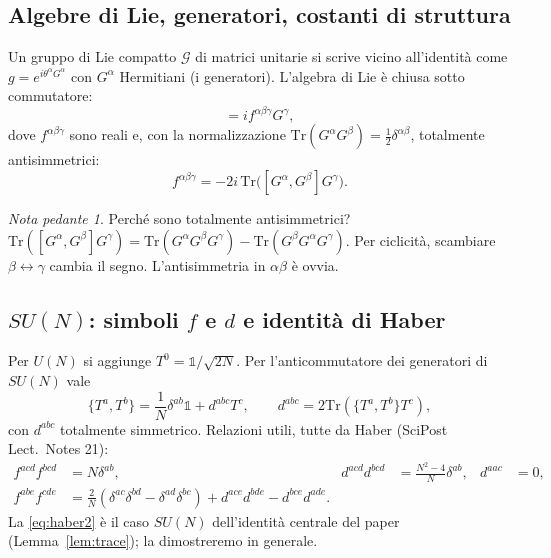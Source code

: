 \documentclass[11pt,a4paper]{article}
\numberwithin{equation}{section}
\theoremstyle{remark}
\newtheorem*{pedante}{Nota pedante}
\newcommand{\Tr}{\mathrm{Tr}}
\newcommand{\G}{\mathcal{G}}
\newcommand{\one}{\mathbb{1}}
\begin{document}
\subsection{Algebre di Lie, generatori, costanti di struttura}

Un gruppo di Lie compatto $\G$ di matrici unitarie si scrive vicino all'identità come $g=e^{i\theta^\alpha G^\alpha}$ con $G^\alpha$ Hermitiani (i generatori). L'algebra di Lie è chiusa sotto commutatore:
\begin{equation}
[G^\alpha,G^\beta]=i f^{\alpha\beta\gamma}G^\gamma ,
\end{equation}
dove $f^{\alpha\beta\gamma}$ sono reali e, con la normalizzazione $\Tr(G^\alpha G^\beta)=\frac12\delta^{\alpha\beta}$, totalmente antisimmetrici:
\begin{equation}
f^{\alpha\beta\gamma}=-2i\,\Tr\big([G^\alpha,G^\beta]G^\gamma\big).
\end{equation}
\begin{pedante}
Perché sono totalmente antisimmetrici? $\Tr([G^\alpha,G^\beta]G^\gamma)=\Tr(G^\alpha G^\beta G^\gamma)-\Tr(G^\beta G^\alpha G^\gamma)$. Per ciclicità, scambiare $\beta\leftrightarrow\gamma$ cambia il segno. L'antisimmetria in $\alpha\beta$ è ovvia.
\end{pedante}

\subsection{$SU(N)$: simboli $f$ e $d$ e identità di Haber}

Per $U(N)$ si aggiunge $T^0=\one/\sqrt{2N}$. Per l'anticommutatore dei generatori di $SU(N)$ vale
\begin{equation}
\{T^a,T^b\}=\frac1N\delta^{ab}\one+d^{abc}T^c,\qquad d^{abc}=2\Tr(\{T^a,T^b\}T^c),
\label{eq:dSU}
\end{equation}
con $d^{abc}$ totalmente simmetrico. Relazioni utili, tutte da Haber (SciPost Lect.\ Notes 21):
\begin{align}
f^{acd}f^{bcd}&=N\delta^{ab}, & d^{acd}d^{bcd}&=\frac{N^2-4}{N}\delta^{ab}, & d^{aac}&=0, \label{eq:haber1}\\
f^{abe}f^{cde}&=\frac2N(\delta^{ac}\delta^{bd}-\delta^{ad}\delta^{bc})+d^{ace}d^{bde}-d^{bce}d^{ade}. \label{eq:haber2}
\end{align}
La \eqref{eq:haber2} è il caso $SU(N)$ dell'identità centrale del paper (Lemma~\ref{lem:trace}); la dimostreremo in generale.
\end{document}
